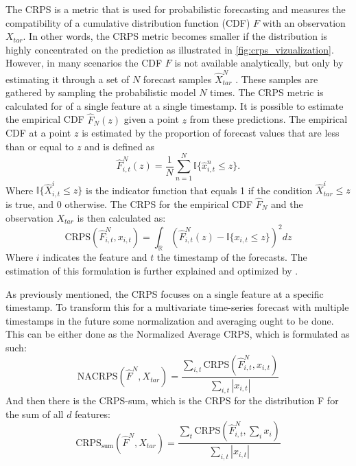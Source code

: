 The CRPS is a metric that is used for probabilistic forecasting and measures the compatibility of a cumulative distribution function (CDF) $F$ with an observation $X_{tar}$. In other words, the CRPS metric becomes smaller if the distribution is highly concentrated on the prediction as illustrated in \autoref{fig:crps_vizualization}. However, in many scenarios the CDF $F$ is not available analytically, but only by estimating it through a set of $N$ forecast samples $\hat{X}_{tar}^N$ \cite{jordan_evaluating_2019}. These samples are gathered by sampling the probabilistic model $N$ times.
The CRPS metric is calculated for of a single feature at a single timestamp. It is possible to estimate the empirical CDF $\hat{F}_N(z)$ given a point $z$ from these predictions. The empirical CDF at a point $z$ is estimated by the proportion of forecast values that are less than or equal to $z$ and is defined as
\begin{equation}
\hat{F}_{i,t}^N(z) = \frac{1}{N} \sum_{n=1}^{N} \mathbb{I}\{\hat{x}_{i,t}^n \leq z\}.
\end{equation}
Where $\mathbb{I}\{\hat{X}_{i,t}^i \leq z\}$ is the indicator function that equals 1 if the condition $\hat{X}_{tar}^i \leq z$ is true, and 0 otherwise.
The CRPS for the empirical CDF $\hat{F}_N$ and the observation $X_{tar}$ is then calculated as:
\begin{equation} \label{eq:crps}
\text{CRPS}(\hat{F}_{i,t}^N, x_{i,t}) = \int_{\mathbb{R}} \left( \hat{F}_{i,t}^N(z) - \mathbb{I}\{x_{i,t} \leq z\} \right)^2 dz
\end{equation}
Where $i$ indicates the feature and $t$ the timestamp of the forecasts. The estimation of this formulation is further explained and optimized by \textcite{jordan_evaluating_2019}.

As previously mentioned, the CRPS focuses on a single feature at a specific timestamp. To transform this for a multivariate time-series forecast with multiple timestamps in the future some normalization and averaging ought to be done. This can be either done as the Normalized Average CRPS, which is formulated as such:
\begin{equation} \label{eq:nacrps}
    \text{NACRPS}(\hat{F}^N, X_{tar}) = \frac{\sum_{i,t} \text{CRPS}(\hat{F}_{i,t}^N, x_{i,t})}{\sum_{i,t} |x_{i,t}|}
\end{equation}
And then there is the CRPS-sum, which is the CRPS for the distribution F for the sum of all $d$ features:
\begin{equation} \label{eq:crps-sum}
    \text{CRPS}_\text{sum}(\hat{F}^N, X_{tar}) = \frac{\sum_{t} \text{CRPS}(\hat{F}_{i,t}^N, \sum_{i} x_i)}{\sum_{i,t} |x_{i,t}|}
\end{equation}


